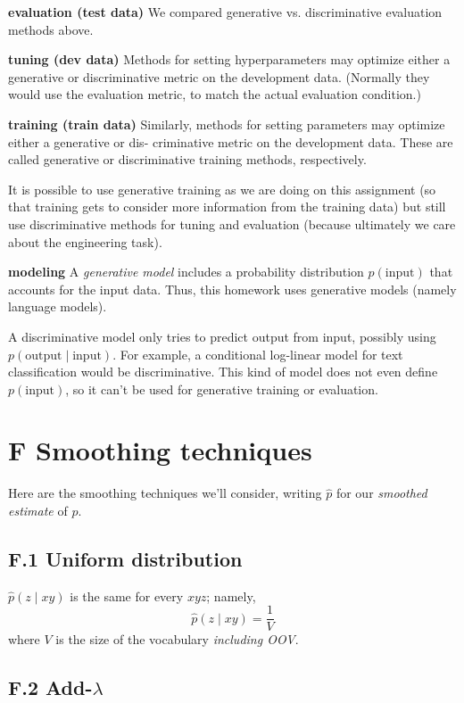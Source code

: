 \documentclass[12pt]{article}
\theoremstyle{plain}
\theoremstyle{definition}
\theoremstyle{remark}
\begin{document}
\textbf{evaluation (test data)} We compared generative vs. discriminative evaluation methods above.  

\textbf{tuning (dev data)} Methods for setting hyperparameters may optimize either a generative or discriminative 
metric on the development data. (Normally they would use the evaluation metric, to match the actual 
evaluation condition.)  

\textbf{training (train data)} Similarly, methods for setting parameters may optimize either a generative or dis-
criminative metric on the development data. These are called generative or discriminative training 
methods, respectively.  

It is possible to use generative training as we are doing on this assignment (so that training gets to 
consider more information from the training data) but still use discriminative methods for tuning and 
evaluation (because ultimately we care about the engineering task).  

\textbf{modeling} A \textit{generative model} includes a probability distribution $p(\text{input})$ that accounts for the input data. 
Thus, this homework uses generative models (namely language models).  

A discriminative model only tries to predict output from input, possibly using $p(\text{output}\mid\text{input})$. For 
example, a conditional log-linear model for text classification would be discriminative. This kind of 
model does not even define $p(\text{input})$, so it can’t be used for generative training or evaluation.  

\section*{F \quad Smoothing techniques}

Here are the smoothing techniques we’ll consider, writing $\hat{p}$ for our \textit{smoothed estimate} of $p$.  

\subsection*{F.1 \quad Uniform distribution}

$\hat{p}(z \mid xy)$ is the same for every $xyz$; namely,  
\begin{equation}
\hat{p}(z \mid xy) = \frac{1}{V}
\end{equation}  
where $V$ is the size of the vocabulary \textit{including OOV}.  

\subsection*{F.2 \quad Add-$\lambda$}
\end{document}
